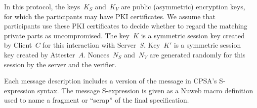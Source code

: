 \documentclass[titlepage,12pt]{article}
\theoremstyle{definition}
\begin{document}
In this protocol, the keys~$K_S$ and~$K_V$ are public (asymmetric)
encryption keys, for which the participants may have PKI certificates.
We assume that participants use these PKI certificates to decide
whether to regard the matching private parts as uncompromised.  The
key~$K$ is a symmetric session key created by Client~$C$ for this
interaction with Server~$S$.  Key~$K'$ is a symmetric session key
created by Attester~$A$.  Nonces~$N_S$ and~$N_V$ are generated
randomly for this session by the server and the verifier.



Each message description includes a version of the message in CPSA's
S-expression syntax.  The message S-expression is given as a Nuweb
macro definition used to name a fragment or ``scrap'' of the final
specification.
\end{document}
